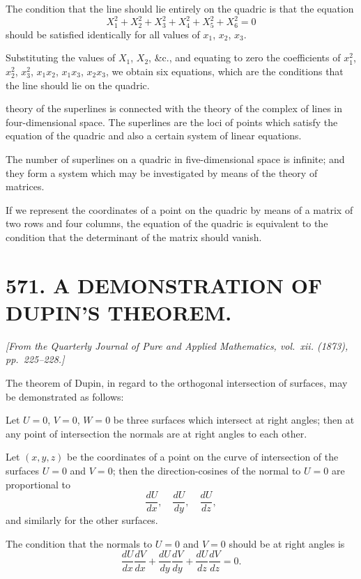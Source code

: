 \documentclass[11pt,a4paper]{article}
\theoremstyle{plain}
\theoremstyle{definition}
\theoremstyle{remark}
\newcommand{\paper}[2]{\section*{#1 #2}}
\newcommand{\papersource}[1]{\par\noindent\textit{#1}\par\medskip}
\begin{document}
The condition that the line should lie entirely on the quadric is that the equation
\[
X_1^2 + X_2^2 + X_3^2 + X_4^2 + X_5^2 + X_6^2 = 0
\]
should be satisfied identically for all values of $x_1$, $x_2$, $x_3$.

Substituting the values of $X_1$, $X_2$, \&c., and equating to zero the coefficients of $x_1^2$, $x_2^2$, $x_3^2$, $x_1x_2$, $x_1x_3$, $x_2x_3$, we obtain six equations, which are the conditions that the line should lie on the quadric.

\newpage

theory of the superlines is connected with the theory of the complex of lines in four-dimensional space. The superlines are the loci of points which satisfy the equation of the quadric and also a certain system of linear equations.

The number of superlines on a quadric in five-dimensional space is infinite; and they form a system which may be investigated by means of the theory of matrices.

If we represent the coordinates of a point on the quadric by means of a matrix of two rows and four columns, the equation of the quadric is equivalent to the condition that the determinant of the matrix should vanish.

\newpage
\paper{571.}{A DEMONSTRATION OF DUPIN'S THEOREM.}

\papersource{[From the Quarterly Journal of Pure and Applied Mathematics, vol.~xii. (1873), pp.~225--228.]}

The theorem of Dupin, in regard to the orthogonal intersection of surfaces, may be demonstrated as follows:

Let $U = 0$, $V = 0$, $W = 0$ be three surfaces which intersect at right angles; then at any point of intersection the normals are at right angles to each other.

Let $(x, y, z)$ be the coordinates of a point on the curve of intersection of the surfaces $U = 0$ and $V = 0$; then the direction-cosines of the normal to $U = 0$ are proportional to
\[
\frac{dU}{dx}, \quad \frac{dU}{dy}, \quad \frac{dU}{dz},
\]
and similarly for the other surfaces.

The condition that the normals to $U = 0$ and $V = 0$ should be at right angles is
\[
\frac{dU}{dx}\frac{dV}{dx} + \frac{dU}{dy}\frac{dV}{dy} + \frac{dU}{dz}\frac{dV}{dz} = 0.
\]
\end{document}
